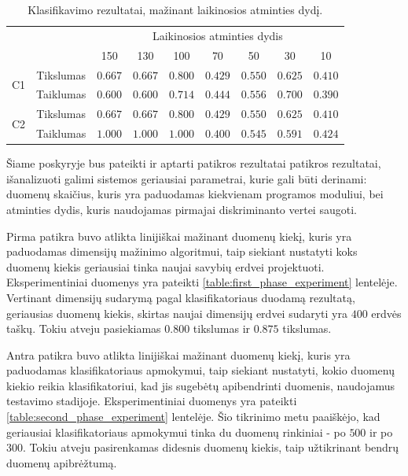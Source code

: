 \documentclass[]{vgtuef}
\begin{document}
\begin{table}
	\centering
	\caption{Klasifikavimo rezultatai, mažinant laikinosios atminties dydį.}
	\label{table:memory_linear_experiment}
	\begin{tabular}{|c|c|c|c|c|c|c|c|c|} \hline
			& & \multicolumn{7}{c|}{Laikinosios atminties dydis} \\ \cline{3-9}
						&	& 150 & 130 & 100 & 70 & 50 & 30 & 10\\ \hline
		\multirow{2}{*}{C1}
		& Tikslumas	& $0.667$ & $0.667$ & $\mathbf{0.800}$ & $0.429$ & $0.550$ & $0.625$ & $0.410$ \\ \cline{2-9}
		& Taiklumas  &	$0.600$ & $0.600$ & $\mathbf{0.714}$ & $0.444$ & $0.556$ & $0.700$ & $0.390$ \\ \hline
		\multirow{2}{*}{C2}
		& Tikslumas	& $0.667$ & $0.667$ & $\mathbf{0.800}$ & $0.429$ & $0.550$ & $0.625$ & $0.410$ \\ \cline{2-9}
		& Taiklumas  &	$1.000$ & $1.000$ & $\mathbf{1.000}$ & $0.400$ & $0.545$ & $0.591$ & $0.424$ \\ \hline
	\end{tabular}
\end{table}

Šiame poskyryje bus pateikti ir aptarti patikros rezultatai patikros rezultatai, išanalizuoti galimi sistemos geriausiai parametrai, kurie gali būti derinami: duomenų skaičius, kuris yra paduodamas kiekvienam programos moduliui, bei atminties dydis, kuris naudojamas pirmajai diskriminanto vertei saugoti.

Pirma patikra buvo atlikta linijiškai mažinant duomenų kiekį, kuris yra paduodamas dimensijų mažinimo algoritmui, taip siekiant nustatyti koks duomenų kiekis geriausiai tinka naujai savybių erdvei projektuoti. Eksperimentiniai duomenys yra pateikti \ref{table:first_phase_experiment} lentelėje. Vertinant dimensijų sudarymą pagal klasifikatoriaus duodamą rezultatą, geriausias duomenų kiekis, skirtas naujai dimensijų erdvei sudaryti yra $400$ erdvės taškų. Tokiu atveju pasiekiamas $0.800$ tikslumas ir $0.875$ tikslumas. 

Antra patikra buvo atlikta linijiškai mažinant duomenų kiekį, kuris yra paduodamas klasifikatoriaus apmokymui, taip siekiant nustatyti, kokio duomenų kiekio reikia klasifikatoriui, kad jis sugebėtų apibendrinti duomenis, naudojamus testavimo stadijoje. Eksperimentiniai duomenys yra pateikti \ref{table:second_phase_experiment} lentelėje. Šio tikrinimo metu paaiškėjo, kad geriausiai klasifikatoriaus apmokymui tinka du duomenų rinkiniai - po $500$ ir po $300$. Tokiu atveju pasirenkamas didesnis duomenų kiekis, taip užtikrinant bendrų duomenų apibrėžtumą.
\end{document}

